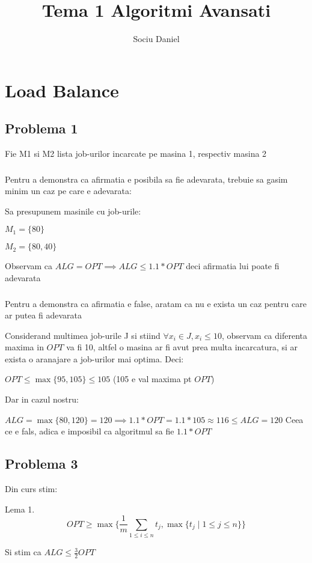 \documentclass[a4paper]{report}
\title{Tema 1 Algoritmi Avansati}
\author{Sociu Daniel}
\begin{document}
\chapter*{Load Balance}
\setcounter{section}{0}
\section{Problema 1}
Fie M1 si M2 lista job-urilor incarcate pe masina 1, respectiv masina 2

\subsection{}
Pentru a demonstra ca afirmatia e posibila sa fie adevarata, trebuie sa gasim minim un caz pe care e adevarata:

Sa presupunem masinile cu job-urile:

$M_{1}=\{80\}$

$M_{2}=\{80,40\}$

Observam ca $ALG=OPT \implies ALG\leq1.1*OPT$ deci afirmatia lui poate fi adevarata

\subsection{}
Pentru a demonstra ca afirmatia e false, aratam ca nu e exista un caz pentru care ar putea fi adevarata

Considerand multimea job-urile J si stiind $\forall x_{i} \in J, x_{i}\leq10$, observam ca diferenta maxima in $OPT$ va fi 10,
altfel o masina ar fi avut prea multa incarcatura, si ar exista o aranajare a job-urilor mai optima. Deci: \newline

$OPT\leq \max\{95,105\} \leq 105$ (105 e val maxima pt $OPT$)

Dar in cazul nostru:

$ALG= \max\{80,120\}=120 \implies 1.1*OPT=1.1*105\approx116\leq ALG=120$ Ceea ce e fals, adica e imposibil ca algoritmul sa fie $1.1*OPT$

\section{Problema 3}
Din curs stim:

Lema 1. \[OPT\geq \max\{\frac{1}{m} \sum_{1\leq i \leq n} t_{j} , \max\{t_{j} \mid 1\leq j \leq n\} \}\]

Si stim ca $ALG\leq \frac{3}{2}OPT$
\end{document}
